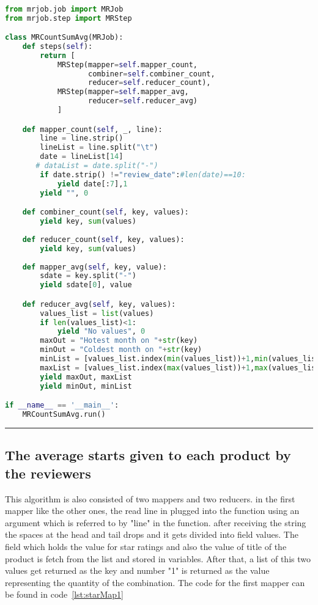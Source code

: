 \renewcommand{\lstlistingname}{Code}
\lstset{style=mystyle}
\begin{lstlisting}[language=Python, caption={Number of Reviews for Each Month}, label={lst:reviewsPerMonth}, mathescape = true, breaklines=true]

from mrjob.job import MRJob
from mrjob.step import MRStep

class MRCountSumAvg(MRJob):
    def steps(self):
        return [
            MRStep(mapper=self.mapper_count,
                   combiner=self.combiner_count,
                   reducer=self.reducer_count),
            MRStep(mapper=self.mapper_avg,
                   reducer=self.reducer_avg)
            ]

    def mapper_count(self, _, line):
        line = line.strip()  
        lineList = line.split("\t")
        date = lineList[14]
       # dataList = date.split("-")
        if date.strip() !="review_date":#len(date)==10:
            yield date[:7],1
        yield "", 0

    def combiner_count(self, key, values):
        yield key, sum(values)
        
    def reducer_count(self, key, values):
        yield key, sum(values)
        
    def mapper_avg(self, key, value):
        sdate = key.split("-")
        yield sdate[0], value

    def reducer_avg(self, key, values):
        values_list = list(values)
        if len(values_list)<1:
            yield "No values", 0
        maxOut = "Hotest month on "+str(key)
        minOut = "Coldest month on "+str(key)
        minList = [values_list.index(min(values_list))+1,min(values_list)]
        maxList = [values_list.index(max(values_list))+1,max(values_list)]
        yield maxOut, maxList
        yield minOut, minList

if __name__ == '__main__':
    MRCountSumAvg.run()

\end{lstlisting}

\rule{200 pt}{0.5 pt}



\subsection{The average starts given to each product by the reviewers}

This algorithm is also consisted of two mappers and two reducers. in the first mapper like the other ones, the read line in plugged into the function using an argument which is referred to by "line" in the function. after receiving the string the spaces at the head and tail drops and it gets divided into field values. The field which holds the value for star ratings and also the value of title of the product is fetch from the list and stored in variables. After that, a list of this two values get returned as the key and number "1" is returned as the value representing the quantity of the combination. The  code for the first mapper can be found in code~\ref{lst:starMap1}

